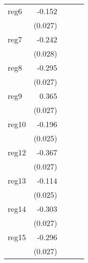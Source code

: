 {\begin{longtable}{l*{4}{D{.}{.}{-1}}}
\addlinespace
reg6        &      -0.152\sym{***}&                     &                     &                     \\
            &     (0.027)         &                     &                     &                     \\
\addlinespace
reg7        &      -0.242\sym{***}&                     &                     &                     \\
            &     (0.028)         &                     &                     &                     \\
\addlinespace
reg8        &      -0.295\sym{***}&                     &                     &                     \\
            &     (0.027)         &                     &                     &                     \\
\addlinespace
reg9        &       0.365\sym{***}&                     &                     &                     \\
            &     (0.027)         &                     &                     &                     \\
\addlinespace
reg10       &      -0.196\sym{***}&                     &                     &                     \\
            &     (0.025)         &                     &                     &                     \\
\addlinespace
reg12       &      -0.367\sym{***}&                     &                     &                     \\
            &     (0.027)         &                     &                     &                     \\
\addlinespace
reg13       &      -0.114\sym{***}&                     &                     &                     \\
            &     (0.025)         &                     &                     &                     \\
\addlinespace
reg14       &      -0.303\sym{***}&                     &                     &                     \\
            &     (0.027)         &                     &                     &                     \\
\addlinespace
reg15       &      -0.296\sym{***}&                     &                     &                     \\
            &     (0.027)         &                     &                     &                     \\

\end{longtable}}
